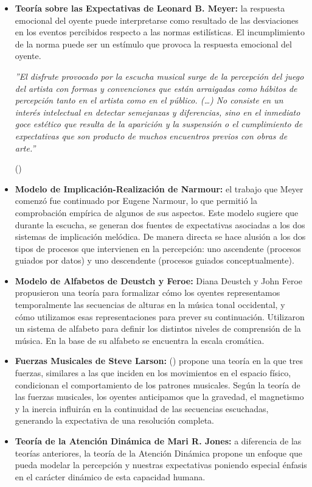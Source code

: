 \begin{itemize}
	\item \textbf{Teoría sobre las Expectativas de Leonard B. Meyer:} la respuesta emocional del oyente puede interpretarse como resultado de las desviaciones en los eventos percibidos respecto a las normas estilísticas. El incumplimiento de la norma puede ser un estímulo que provoca la respuesta emocional del oyente.
	
	\begin{adjustwidth}{100pt}{0pt}
		\textit{''El disfrute provocado por la escucha musical surge de la percepción del juego del artista con formas y convenciones que están arraigadas como hábitos de percepción tanto en el artista como en el público. (…) No consiste en un interés intelectual en detectar semejanzas y diferencias, sino en el inmediato goce estético que resulta de la aparición y la suspensión o el cumplimiento de expectativas que son producto de muchos encuentros previos con obras de arte.''}
		\begin{flushright}
			\vspace{-10px}
			(\cite{MEYER:1956})
		\end{flushright}
	\end{adjustwidth}
	
	\item \textbf{Modelo de Implicación-Realización de Narmour:} el trabajo que Meyer comenzó fue continuado por Eugene Narmour, lo que permitió la comprobación empírica de algunos de sus aspectos. Este modelo sugiere que durante la escucha, se generan dos fuentes de expectativas asociadas a los dos sistemas de implicación melódica. De manera directa se hace alusión a los dos tipos de procesos que intervienen en la percepción: uno ascendente (procesos guiados por datos) y uno descendente (procesos guiados conceptualmente).
	\item \textbf{Modelo de Alfabetos de Deustch y Feroe:} Diana Deustch y John Feroe propusieron una teoría para formalizar cómo los oyentes representamos temporalmente las secuencias de alturas en la música tonal occidental, y cómo utilizamos esas representaciones para prever su continuación. Utilizaron un sistema de alfabeto para definir los distintos niveles de comprensión de la música. En la base de su alfabeto se encuentra la escala cromática.
	\item \textbf{Fuerzas Musicales de Steve Larson:} \citeauthor{LARSON:2002} (\citeyear{LARSON:2002}) propone una teoría en la que tres fuerzas, similares a las que inciden en los movimientos en el espacio físico, condicionan el comportamiento de los patrones musicales. Según la teoría de las fuerzas musicales, los oyentes anticipamos que la gravedad, el magnetismo y la inercia influirán en la continuidad de las secuencias escuchadas, generando la expectativa de una resolución completa.
	\item \textbf{Teoría de la Atención Dinámica de Mari R. Jones:} a diferencia de las teorías anteriores, la teoría de la Atención Dinámica propone un enfoque que pueda modelar la percepción y nuestras expectativas poniendo especial énfasis en el carácter dinámico de esta capacidad humana.
	

\end{itemize}
